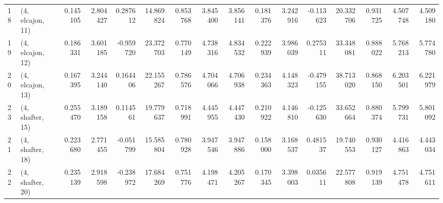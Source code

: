 \begin{tabular}{llrrrrrrrrrrrrrr}
18 &  (4, elcajon, 11) &   0.145105 &  2.804427 &  0.287612 &  14.869824 &  0.853768 &   3.845400 &  3.856141 &  0.181376 &   3.242916 & -0.113623 &   20.332706 &  0.931725 &   4.507748 &   4.509180 \\
19 &  (4, elcajon, 12) &   0.186331 &  3.601185 & -0.959720 &  23.372703 &  0.770149 &   4.738316 &  4.834532 &  0.222939 &   3.986039 &  0.275311 &   33.348081 &  0.888022 &   5.768213 &   5.774780 \\
20 &  (4, elcajon, 13) &   0.167395 &  3.244140 &  0.164406 &  22.155267 &  0.786576 &   4.704066 &  4.706938 &  0.234363 &   4.148323 & -0.479155 &   38.713020 &  0.868150 &   6.203501 &   6.221979 \\
23 &  (4, shafter, 15) &   0.255470 &  3.189158 &  0.114561 &  19.779637 &  0.718991 &   4.445955 &  4.447430 &  0.210922 &   4.146810 & -0.125630 &   33.652664 &  0.880374 &   5.799731 &   5.801092 \\
21 &  (4, shafter, 18) &   0.223680 &  2.771455 & -0.051799 &  15.585804 &  0.780928 &   3.947546 &  3.947886 &  0.158000 &   3.168537 &  0.481537 &   19.740553 &  0.930127 &   4.416863 &   4.443034 \\
22 &  (4, shafter, 20) &   0.235139 &  2.918598 & -0.238972 &  17.684269 &  0.751776 &   4.198471 &  4.205267 &  0.170345 &   3.398003 &  0.035611 &   22.577808 &  0.919139 &   4.751478 &   4.751611 \\
\bottomrule
\end{tabular}
